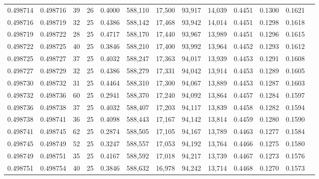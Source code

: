 \begin{tabular}{rrrrrrrrrrrrr}
0.498714 & 0.498716 &    39 &  26 &                                     0.4000 & 588,110 &  17,500 &  93,917 &  14,039 & 0.4451 & 0.1300 & 0.1621 \\
0.498716 & 0.498719 &    32 &  25 &                                     0.4386 & 588,142 &  17,468 &  93,942 &  14,014 & 0.4451 & 0.1298 & 0.1618 \\
0.498719 & 0.498722 &    28 &  25 &                                     0.4717 & 588,170 &  17,440 &  93,967 &  13,989 & 0.4451 & 0.1296 & 0.1615 \\
0.498722 & 0.498725 &    40 &  25 &                                     0.3846 & 588,210 &  17,400 &  93,992 &  13,964 & 0.4452 & 0.1293 & 0.1612 \\
0.498725 & 0.498727 &    37 &  25 &                                     0.4032 & 588,247 &  17,363 &  94,017 &  13,939 & 0.4453 & 0.1291 & 0.1608 \\
0.498727 & 0.498729 &    32 &  25 &                                     0.4386 & 588,279 &  17,331 &  94,042 &  13,914 & 0.4453 & 0.1289 & 0.1605 \\
0.498730 & 0.498732 &    31 &  25 &                                     0.4464 & 588,310 &  17,300 &  94,067 &  13,889 & 0.4453 & 0.1287 & 0.1603 \\
0.498732 & 0.498736 &    60 &  25 &                                     0.2941 & 588,370 &  17,240 &  94,092 &  13,864 & 0.4457 & 0.1284 & 0.1597 \\
0.498736 & 0.498738 &    37 &  25 &                                     0.4032 & 588,407 &  17,203 &  94,117 &  13,839 & 0.4458 & 0.1282 & 0.1594 \\
0.498738 & 0.498741 &    36 &  25 &                                     0.4098 & 588,443 &  17,167 &  94,142 &  13,814 & 0.4459 & 0.1280 & 0.1590 \\
0.498741 & 0.498745 &    62 &  25 &                                     0.2874 & 588,505 &  17,105 &  94,167 &  13,789 & 0.4463 & 0.1277 & 0.1584 \\
0.498745 & 0.498749 &    52 &  25 &                                     0.3247 & 588,557 &  17,053 &  94,192 &  13,764 & 0.4466 & 0.1275 & 0.1580 \\
0.498749 & 0.498751 &    35 &  25 &                                     0.4167 & 588,592 &  17,018 &  94,217 &  13,739 & 0.4467 & 0.1273 & 0.1576 \\
0.498751 & 0.498754 &    40 &  25 &                                     0.3846 & 588,632 &  16,978 &  94,242 &  13,714 & 0.4468 & 0.1270 & 0.1573 \\

\end{tabular}
